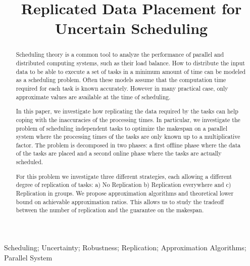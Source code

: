 \documentclass[10pt, conference, compsocconf]{IEEEtran}
\begin{document}
\title{Replicated Data Placement for Uncertain Scheduling}


\author{
}

\maketitle


\begin{abstract}
  Scheduling theory is a common tool to analyze the
  performance of parallel and distributed computing systems, such as their load
  balance. How to distribute the input data to be able to execute a
  set of tasks in a minimum amount of time can be modeled as a
  scheduling problem. Often these models assume that the computation
  time required for each task is known accurately. However in many
  practical case, only approximate values are available at the time of
  scheduling.

  In this paper, we investigate how replicating the data required by
  the tasks can help coping with the inaccuracies of the processing
  times. In particular, we investigate the problem of scheduling
  independent tasks to optimize the makespan on a parallel system
  where the processing times of the tasks are only known up to a
  multiplicative factor. The problem is decomposed in two phases: a
  first offline phase where the data of the tasks are placed and a second
  online phase where the tasks are actually scheduled.

  For this problem we investigate three different strategies, each
  allowing a different degree of replication of tasks: a) No
  Replication b) Replication everywhere and c) Replication in
  groups. We propose approximation algorithms and theoretical lower
  bound on achievable approximation ratios.  This allows us to study
  the tradeoff between the number of replication and the guarantee on
  the makespan.
\end{abstract}

\begin{IEEEkeywords}
Scheduling; Uncertainty; Robustness; Replication; Approximation Algorithms; Parallel System

\end{IEEEkeywords}
\end{document}
